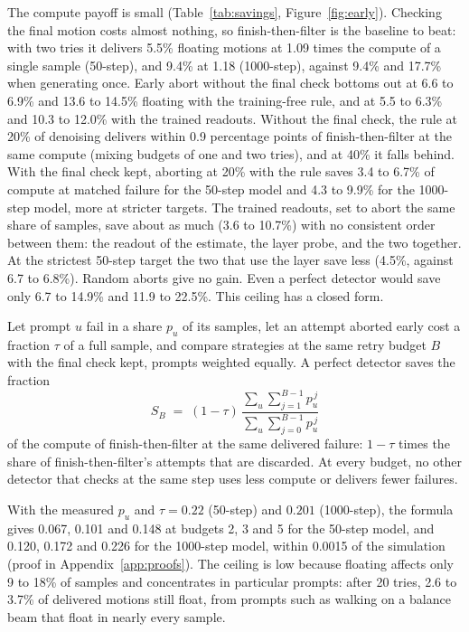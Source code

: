 The compute payoff is small (Table~\ref{tab:savings}, Figure~\ref{fig:early}). Checking the final motion costs almost nothing, so finish-then-filter is the baseline to beat: with two tries it delivers 5.5\% floating motions at 1.09 times the compute of a single sample (50-step), and 9.4\% at 1.18 (1000-step), against 9.4\% and 17.7\% when generating once. Early abort without the final check bottoms out at 6.6 to 6.9\% and 13.6 to 14.5\% floating with the training-free rule, and at 5.5 to 6.3\% and 10.3 to 12.0\% with the trained readouts. Without the final check, the rule at 20\% of denoising delivers within 0.9 percentage points of finish-then-filter at the same compute (mixing budgets of one and two tries), and at 40\% it falls behind. With the final check kept, aborting at 20\% with the rule saves 3.4 to 6.7\% of compute at matched failure for the 50-step model and 4.3 to 9.9\% for the 1000-step model, more at stricter targets. The trained readouts, set to abort the same share of samples, save about as much (3.6 to 10.7\%) with no consistent order between them: the readout of the estimate, the layer probe, and the two together. At the strictest 50-step target the two that use the layer save less (4.5\%, against 6.7 to 6.8\%). Random aborts give no gain. Even a perfect detector would save only 6.7 to 14.9\% and 11.9 to 22.5\%. This ceiling has a closed form.
\begin{proposition}\label{prop:ceiling}
Let prompt $u$ fail in a share $p_u$ of its samples, let an attempt aborted early cost a fraction $\tau$ of a full sample, and compare strategies at the same retry budget $B$ with the final check kept, prompts weighted equally. A perfect detector saves the fraction
\begin{equation}
    S_B \;=\; (1-\tau)\, \frac{\sum_u \sum_{j=1}^{B-1} p_u^{\,j}}{\sum_u \sum_{j=0}^{B-1} p_u^{\,j}}
\end{equation}
of the compute of finish-then-filter at the same delivered failure: $1-\tau$ times the share of finish-then-filter's attempts that are discarded. At every budget, no other detector that checks at the same step uses less compute or delivers fewer failures.
\end{proposition}
With the measured $p_u$ and $\tau = 0.22$ (50-step) and $0.201$ (1000-step), the formula gives 0.067, 0.101 and 0.148 at budgets 2, 3 and 5 for the 50-step model, and 0.120, 0.172 and 0.226 for the 1000-step model, within 0.0015 of the simulation (proof in Appendix~\ref{app:proofs}). The ceiling is low because floating affects only 9 to 18\% of samples and concentrates in particular prompts: after 20 tries, 2.6 to 3.7\% of delivered motions still float, from prompts such as walking on a balance beam that float in nearly every sample.

